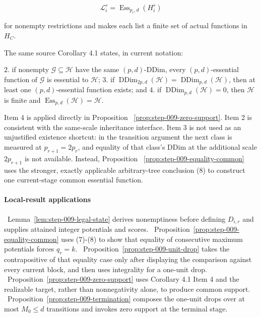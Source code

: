 \[
 \mathcal L_i^r=\operatorname{Ess}_{p_r,d}(H_i^r)
 \tag{10}
\]

for nonempty restrictions and makes each list a finite set of actual
functions in \(H_C\).

The same source Corollary 4.1 states, in current notation:

2. if nonempty \(\mathcal G\subseteq\mathcal H\) have the same
   \((p,d)\)-DDim, every \((p,d)\)-essential function of \(\mathcal G\) is
   essential to \(\mathcal H\);
3. if
   \(\operatorname{DDim}_{2p,d}(\mathcal H)
      =\operatorname{DDim}_{p,d}(\mathcal H)\), then at least one
   \((p,d)\)-essential function exists; and
4. if \(\operatorname{DDim}_{p,d}(\mathcal H)=0\), then \(\mathcal H\) is
   finite and
   \(\operatorname{Ess}_{p,d}(\mathcal H)=\mathcal H\).

Item 4 is applied directly in Proposition
~\ref{prop:step-009-zero-support}. Item 2 is consistent with the 
same-scale inheritance interface. Item 3 is not used as an unjustified
existence shortcut: in the transition argument the next class is measured
at \(p_{r+1}=2p_r\), and equality of that class's DDim at the additional
scale \(2p_{r+1}\) is not available. Instead, Proposition
~\ref{prop:step-009-equality-common} uses the stronger, exactly applicable
arbitrary-tree conclusion (8) to construct one current-stage common
essential function.

\paragraph{Local-result applications}

\noindent\textbullet\ Lemma~\ref{lem:step-009-legal-state} derives nonemptiness before defining
  \(D_{i,r}\) and supplies attained integer potentials and scores.
\noindent\textbullet\ Proposition~\ref{prop:step-009-equality-common} uses (7)-(8) to show that
  equality of consecutive maximum potentials forces \(q_r=k\).
\noindent\textbullet\ Proposition~\ref{prop:step-009-unit-drop} takes the contrapositive of
  that equality case only after displaying the comparison against every
  current block, and then uses integrality for a one-unit drop.
\noindent\textbullet\ Proposition~\ref{prop:step-009-zero-support} uses Corollary 4.1 Item 4
  and the realizable target, rather than nonnegativity alone, to produce
  common support.
\noindent\textbullet\ Proposition~\ref{prop:step-009-termination} composes the one-unit drops
  over at most \(M_0\le d\) transitions and invokes zero support at the
  terminal stage.



